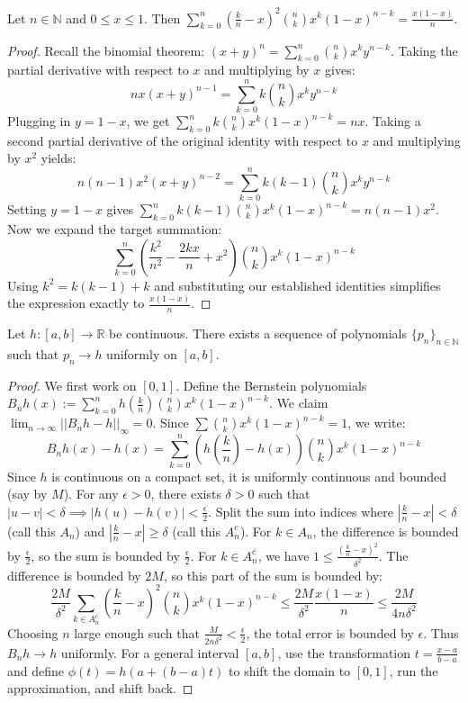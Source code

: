 \begin{lemma}
Let $n \in \mathbb{N}$ and $0 \le x \le 1$. Then $\displaystyle\sum_{k=0}^n \left(\frac{k}{n} - x\right)^2 \binom{n}{k} x^k (1-x)^{n-k} = \frac{x(1-x)}{n}$.
\end{lemma}
\begin{proof}
Recall the binomial theorem: $(x+y)^n = \displaystyle\sum_{k=0}^n \binom{n}{k} x^k y^{n-k}$.
Taking the partial derivative with respect to $x$ and multiplying by $x$ gives:
$$ nx(x+y)^{n-1} = \displaystyle\sum_{k=0}^n k \binom{n}{k} x^k y^{n-k} $$
Plugging in $y = 1-x$, we get $\displaystyle\sum_{k=0}^n k \binom{n}{k} x^k (1-x)^{n-k} = nx$.
Taking a second partial derivative of the original identity with respect to $x$ and multiplying by $x^2$ yields:
$$ n(n-1)x^2(x+y)^{n-2} = \displaystyle\sum_{k=0}^n k(k-1) \binom{n}{k} x^k y^{n-k} $$
Setting $y = 1-x$ gives $\displaystyle\sum_{k=0}^n k(k-1) \binom{n}{k} x^k (1-x)^{n-k} = n(n-1)x^2$.
Now we expand the target summation:
$$ \displaystyle\sum_{k=0}^n \left( \frac{k^2}{n^2} - \frac{2kx}{n} + x^2 \right) \binom{n}{k} x^k (1-x)^{n-k} $$
Using $k^2 = k(k-1) + k$ and substituting our established identities simplifies the expression exactly to $\frac{x(1-x)}{n}$.
\end{proof}

\begin{theorem}
Let $h: [a,b] \rightarrow \mathbb{R}$ be continuous. There exists a sequence of polynomials $\{p_n\}_{n \in \mathbb{N}}$ such that $p_n \rightarrow h$ uniformly on $[a,b]$.
\end{theorem}
\begin{proof}
We first work on $[0,1]$. Define the Bernstein polynomials $B_n h(x) := \displaystyle\sum_{k=0}^n h\left(\frac{k}{n}\right) \binom{n}{k} x^k (1-x)^{n-k}$.
We claim $\lim_{n \rightarrow \infty} ||B_n h - h||_\infty = 0$.
Since $\displaystyle\sum \binom{n}{k} x^k (1-x)^{n-k} = 1$, we write:
$$ B_n h(x) - h(x) = \displaystyle\sum_{k=0}^n \left( h\left(\frac{k}{n}\right) - h(x) \right) \binom{n}{k} x^k (1-x)^{n-k} $$
Since $h$ is continuous on a compact set, it is uniformly continuous and bounded (say by $M$). For any $\epsilon > 0$, there exists $\delta > 0$ such that $|u-v| < \delta \implies |h(u)-h(v)| < \frac{\epsilon}{2}$.
Split the sum into indices where $|\frac{k}{n} - x| < \delta$ (call this $A_n$) and $|\frac{k}{n} - x| \ge \delta$ (call this $A_n^c$).
For $k \in A_n$, the difference is bounded by $\frac{\epsilon}{2}$, so the sum is bounded by $\frac{\epsilon}{2}$.
For $k \in A_n^c$, we have $1 \le \frac{(\frac{k}{n}-x)^2}{\delta^2}$. The difference is bounded by $2M$, so this part of the sum is bounded by:
$$ \frac{2M}{\delta^2} \displaystyle\sum_{k \in A_n^c} \left(\frac{k}{n} - x\right)^2 \binom{n}{k} x^k (1-x)^{n-k} \le \frac{2M}{\delta^2} \frac{x(1-x)}{n} \le \frac{2M}{4n\delta^2} $$
Choosing $n$ large enough such that $\frac{M}{2n\delta^2} < \frac{\epsilon}{2}$, the total error is bounded by $\epsilon$. Thus $B_n h \rightarrow h$ uniformly.
For a general interval $[a,b]$, use the transformation $t = \frac{x-a}{b-a}$ and define $\phi(t) = h(a + (b-a)t)$ to shift the domain to $[0,1]$, run the approximation, and shift back.
\end{proof}

